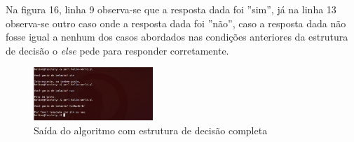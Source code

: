 Na figura 16, linha 9 observa-se que a resposta dada foi  ''sim'', j\'a na linha 13 observa-se outro caso onde a resposta dada foi ''n\~ao'', caso 
a resposta dada n\~ao fosse igual a nenhum dos casos abordados nas condi\c{c}\~oes anteriores da estrutura de decis\~ao o \textit{else} pede para responder 
corretamente. 

\begin{figure}[!htb]
	\centering
	\includegraphics[width=0.4\textwidth]{../5_figuras/image16}
	\caption{Sa\'ida do algoritmo com estrutura de decis\~ao completa}
\end{figure}




